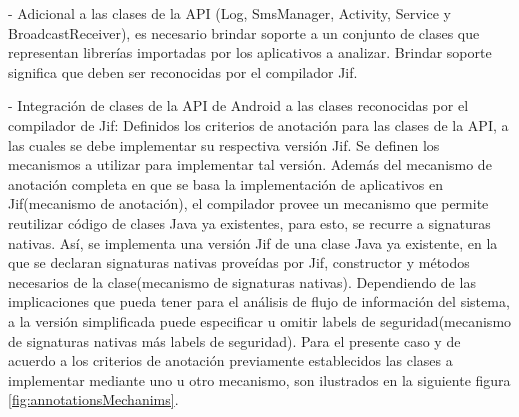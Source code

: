 - Adicional a las clases de la API (Log, SmsManager, Activity, Service y
BroadcastReceiver), es necesario brindar soporte a un conjunto de clases que
representan librerías importadas por los aplicativos a analizar. 
Brindar soporte significa que deben ser reconocidas por el compilador Jif.

% 
- Integración de clases de la API de Android a las clases reconocidas por el
compilador de Jif:\newline
Definidos los criterios de anotación para las clases de la API, a las cuales se
debe implementar su respectiva versión Jif. Se definen los mecanismos a utilizar
para implementar tal versión. Además del mecanismo de anotación completa en que
se basa la implementación de aplicativos en Jif(mecanismo de anotación), el
compilador provee un mecanismo que permite reutilizar código de clases Java ya
existentes, para esto, se recurre a signaturas nativas. Así, se implementa una
versión Jif de una clase Java ya existente, en la que se declaran signaturas
nativas proveídas por Jif, constructor y métodos necesarios de la
clase(mecanismo de signaturas nativas).
Dependiendo de las implicaciones que pueda tener para el análisis de flujo de información del
sistema, a la versión simplificada puede especificar u omitir labels de
seguridad(mecanismo de signaturas nativas más labels de seguridad).\newline 
Para el presente caso y de acuerdo a los criterios de anotación previamente
establecidos las clases a implementar mediante uno u otro mecanismo, son
ilustrados en la siguiente figura \ref{fig:annotationsMechanims}.\newline

